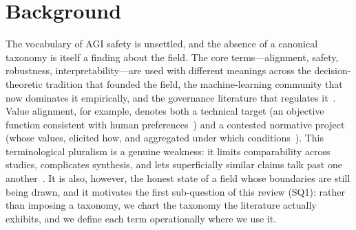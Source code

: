 \section{Background}\label{sec:background}

The vocabulary of AGI safety is unsettled, and the absence of a canonical taxonomy is itself a finding about the field. The core terms---alignment, safety, robustness, interpretability---are used with different meanings across the decision-theoretic tradition that founded the field, the machine-learning community that now dominates it empirically, and the governance literature that regulates it~\cite{bostrom2014superintelligence,russell2019human,hendrycks2023overview}. Value alignment, for example, denotes both a technical target (an objective function consistent with human preferences~\cite{amodei2016concrete}) and a contested normative project (whose values, elicited how, and aggregated under which conditions~\cite{triantafyllopoulos2026value}). This terminological pluralism is a genuine weakness: it limits comparability across studies, complicates synthesis, and lets superficially similar claims talk past one another~\cite{gyevnar2025aisafety,shen2024bidirectional}. It is also, however, the honest state of a field whose boundaries are still being drawn, and it motivates the first sub-question of this review (SQ1): rather than imposing a taxonomy, we chart the taxonomy the literature actually exhibits, and we define each term operationally where we use it.

